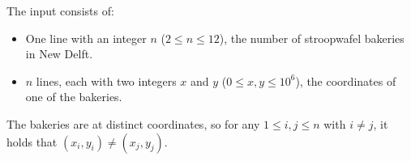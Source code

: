 
  The input consists of:
  \begin{itemize}
    \item One line with an integer $n$ ($2 \le n \le 12$), the number of stroopwafel bakeries in New Delft.
    \item $n$ lines, each with two integers $x$ and $y$ ($0 \le x,y \le 10^6$), the coordinates of one of the bakeries.
  \end{itemize}
  The bakeries are at distinct coordinates, so for any $1 \le i,j \le n$ with $i \neq j$, it holds that $(x_i, y_i) \neq (x_j, y_j)$.
